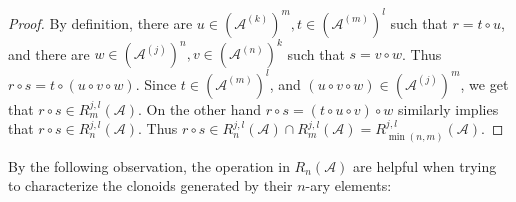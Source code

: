 \documentclass[11pt]{amsart}
\theoremstyle{plain}
\theoremstyle{definition}
\newcommand{\clone}[1]{\mathcal{#1}}
\newcommand{\cloA}{\clone{A}}
\begin{document}
\begin{proof}
By definition, there are $u \in (\cloA^{(k)})^m, t \in (\cloA^{(m)})^l$ such that $r = t \circ u$, and there are $w \in (\cloA^{(j)})^n, v \in (\cloA^{(n)})^k$ such that $s = v\circ w$. Thus $r \circ s = t \circ (u \circ v \circ w)$. Since $t \in (\cloA^{(m)})^l$, and $(u \circ v \circ w) \in (\cloA^{(j)})^m$, we get that $r \circ s \in R_{m}^{j,l}(\cloA)$. On the other hand $r \circ s = (t \circ u \circ v) \circ w$ similarly implies that $r \circ s \in R_{n}^{j,l}(\cloA)$. Thus $r \circ s \in R_{n}^{j,l}(\cloA) \cap R_{m}^{j,l}(\cloA) = R_{\min(n,m)}^{j,l}(\cloA)$.
\end{proof}

By the following observation, the operation in $R_n(\cloA)$ are helpful when trying to characterize the clonoids generated by their $n$-ary elements:
\end{document}
